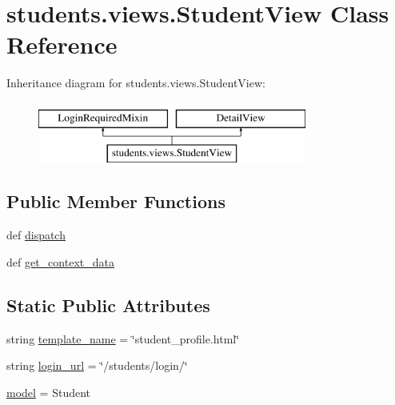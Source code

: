 \hypertarget{classstudents_1_1views_1_1_student_view}{\section{students.\-views.\-Student\-View Class Reference}
\label{classstudents_1_1views_1_1_student_view}
}
Inheritance diagram for students.\-views.\-Student\-View\-:\begin{figure}[H]
\begin{center}
\leavevmode
\includegraphics[height=2.000000cm]{classstudents_1_1views_1_1_student_view}
\end{center}
\end{figure}
\subsection*{Public Member Functions}
\begin{DoxyCompactItemize}
\item 
def \hyperlink{classstudents_1_1views_1_1_student_view_ab04c41f2121d32a620fea480ca8dd538}{dispatch}
\item 
def \hyperlink{classstudents_1_1views_1_1_student_view_aea33d4cd9db8ef7b1caf79b8c4502a94}{get\-\_\-context\-\_\-data}
\end{DoxyCompactItemize}
\subsection*{Static Public Attributes}
\begin{DoxyCompactItemize}
\item 
string \hyperlink{classstudents_1_1views_1_1_student_view_aa2e9eac6cab9a9105aa89d3951bbb233}{template\-\_\-name} = \char`\"{}student\-\_\-profile.\-html\char`\"{}
\item 
string \hyperlink{classstudents_1_1views_1_1_student_view_a86ffef39c7d06b2b55d8fdb1f99c19c1}{login\-\_\-url} = \char`\"{}/students/login/\char`\"{}
\item 
\hyperlink{classstudents_1_1views_1_1_student_view_a870052ccf2e29eac0aefd221be2f916b}{model} = Student
\end{DoxyCompactItemize}


